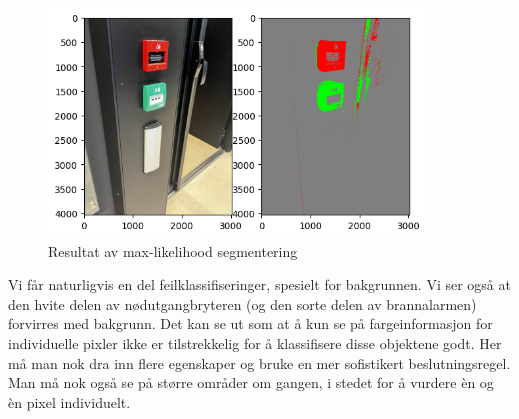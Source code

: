 \documentclass{article}
\begin{document}
\begin{figure}[h!]
    \centering
    \includegraphics[width=10cm]{egne_resultater.png}
    \caption{Resultat av max-likelihood segmentering}
\end{figure}

Vi får naturligvis en del feilklassifiseringer, spesielt for bakgrunnen.
Vi ser også at den hvite delen av nødutgangbryteren (og den sorte delen av brannalarmen) forvirres med bakgrunn.
Det kan se ut som at å kun se på fargeinformasjon for individuelle pixler ikke er tilstrekkelig for å 
klassifisere disse objektene godt. Her må man nok dra inn flere egenskaper og bruke en mer sofistikert beslutningsregel. 
Man må nok også se på større områder om gangen, i stedet for å vurdere èn og èn pixel individuelt.
\end{document}
